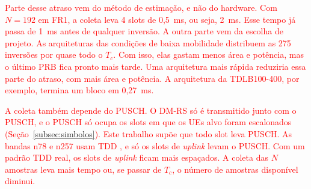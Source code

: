 \textcolor{red}{Parte desse atraso vem do método de estimação, e não do hardware. Com $N = 192$ em FR1, a coleta leva 4 slots de 0,5~ms, ou seja, 2~ms. Esse tempo já passa de 1~ms antes de qualquer inversão. A outra parte vem da escolha de projeto. As arquiteturas das condições de baixa mobilidade distribuem as 275 inversões por quase todo o $T_c$. Com isso, elas gastam menos área e potência, mas o último PRB fica pronto mais tarde. Uma arquitetura mais rápida reduziria essa parte do atraso, com mais área e potência. A arquitetura da TDLB100-400, por exemplo, termina um bloco em 0,27~ms.}

\textcolor{red}{A coleta também depende do PUSCH. O DM-RS só é transmitido junto com o PUSCH, e o PUSCH só ocupa os slots em que os UEs alvo foram escalonados (Seção~\ref{subsec:simbolos}). Este trabalho supõe que todo slot leva PUSCH. As bandas n78 e n257 usam TDD \cite[Tabs.~5.2-1 e 5.2-2]{3gpp-ts38104}, e só os slots de \textit{uplink} levam o PUSCH. Com um padrão TDD real, os slots de \textit{uplink} ficam mais espaçados. A coleta das $N$ amostras leva mais tempo ou, se passar de $T_c$, o número de amostras disponível diminui.}
